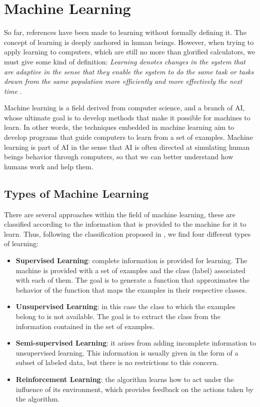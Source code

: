 \section{Machine Learning}

So far, references have been made to learning without formally defining it. The concept of learning is deeply anchored in human beings. However, when trying to apply learning to computers, which are still no more than glorified calculators, we must give some kind of definition: \textit{Learning denotes changes in the system that are adaptive in the sense that they enable the system to do the same task or tasks drawn from the same population more efficiently and more effectively the next time} \cite{Michalski:2013:MLA:2588013}.

Machine learning is a field derived from computer science, and a branch of \acf{AI}, whose ultimate goal is to develop methods that make it possible for machines to learn. In other words, the techniques embedded in machine learning aim to develop programs that guide computers to learn from a set of examples. Machine learning is part of \acs{AI} in the sense that \acs{AI} is often directed at simulating human beings behavior through computers, so that we can better understand how humans work and help them.

\subsection{Types of Machine Learning} \label{sec:TypesOfML}

There are several approaches within the field of machine learning, these are classified according to the information that is provided to the machine for it to learn. Thus, following the classification proposed in \cite{ayodele2010types}, we find four different types of learning:

\begin{itemize}
	
	\item \textbf{Supervised Learning}: complete information is provided for learning. The machine is provided with a set of examples and the class (label) associated with each of them. The goal is to generate a function that approximates the behavior of the function that maps the examples in their respective classes.
	
	\item \textbf{Unsupervised Learning}: in this case the class to which the examples belong to is not available. The goal is to extract the class from the information contained in the set of examples.
	
	\item \textbf{Semi-supervised Learning}: it arises from adding incomplete information to unsupervised learning. This information is usually given in the form of a subset of labeled data, but there is no restrictions to this concern.
	
	\item \textbf{Reinforcement Learning}: the algorithm learns how to act under the influence of its environment, which provides feedback on the actions taken by the algorithm.
	
\end{itemize}

